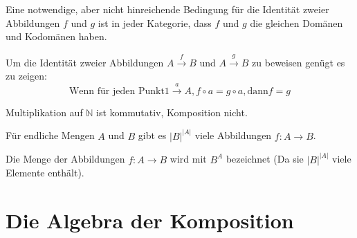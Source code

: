 \documentclass[parskip=half]{scrreprt}
\begin{document}
\begin{remark}
Eine notwendige, aber nicht hinreichende Bedingung für die Identität zweier 
Abbildungen $f$ und $g$ ist in jeder Kategorie, dass $f$ und $g$ die gleichen 
Domänen und Kodomänen haben.
\end{remark}

\begin{remark}
Um die Identität zweier Abbildungen $A \xrightarrow{f} B$ und $A \xrightarrow{g} B$
zu beweisen genügt es zu zeigen:
$$\text{Wenn für jeden Punkt} 1 \xrightarrow{a} A, f ∘ a = g ∘ a, \text{dann} f=g$$
\end{remark}


\begin{remark}
Multiplikation auf $ℕ$ ist kommutativ, Komposition nicht.
\end{remark}


\begin{remark}
Für endliche Mengen $A$ und $B$ gibt es $|B|^{|A|}$ viele Abbildungen 
$f : A → B$.
\end{remark}



\begin{remark}
Die Menge der Abbildungen $f : A → B$ wird mit $B^A$ bezeichnet
(Da sie $|B|^{|A|}$ viele Elemente enthält).
\end{remark}


\part{Die Algebra der Komposition}
\end{document}
